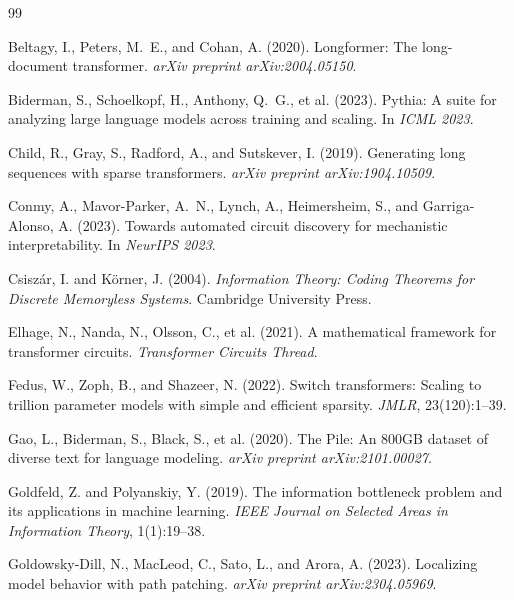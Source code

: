 \documentclass{article}
\begin{document}

\begin{thebibliography}{99}

Beltagy, I., Peters, M.~E., and Cohan, A. (2020).
Longformer: The long-document transformer.
\emph{arXiv preprint arXiv:2004.05150}.

Biderman, S., Schoelkopf, H., Anthony, Q.~G., et al. (2023).
Pythia: A suite for analyzing large language models across training and scaling.
In \emph{ICML 2023}.

Child, R., Gray, S., Radford, A., and Sutskever, I. (2019).
Generating long sequences with sparse transformers.
\emph{arXiv preprint arXiv:1904.10509}.

Conmy, A., Mavor-Parker, A.~N., Lynch, A., Heimersheim, S., and Garriga-Alonso, A. (2023).
Towards automated circuit discovery for mechanistic interpretability.
In \emph{NeurIPS 2023}.

Csisz\'{a}r, I. and K\"{o}rner, J. (2004).
\emph{Information Theory: Coding Theorems for Discrete Memoryless Systems}.
Cambridge University Press.

Elhage, N., Nanda, N., Olsson, C., et al. (2021).
A mathematical framework for transformer circuits.
\emph{Transformer Circuits Thread}.

Fedus, W., Zoph, B., and Shazeer, N. (2022).
Switch transformers: Scaling to trillion parameter models with simple and efficient sparsity.
\emph{JMLR}, 23(120):1--39.

Gao, L., Biderman, S., Black, S., et al. (2020).
The Pile: An 800GB dataset of diverse text for language modeling.
\emph{arXiv preprint arXiv:2101.00027}.

Goldfeld, Z. and Polyanskiy, Y. (2019).
The information bottleneck problem and its applications in machine learning.
\emph{IEEE Journal on Selected Areas in Information Theory}, 1(1):19--38.

Goldowsky-Dill, N., MacLeod, C., Sato, L., and Arora, A. (2023).
Localizing model behavior with path patching.
\emph{arXiv preprint arXiv:2304.05969}.


\end{thebibliography}
\end{document}

